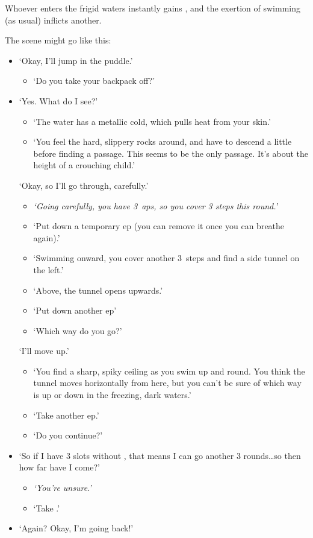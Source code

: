 \begin{multicols}{2}
Whoever enters the frigid waters instantly gains , and the exertion of swimming (as usual) inflicts another.

The scene might go like this:

\begin{itemize}
  \bf
  \item
  `Okay, I'll jump in the puddle.'
  \begin{itemize}
    \it
    \item
    `Do you take your backpack off?'
  \end{itemize}
  \item
  `Yes.
  What do I see?'
  \begin{itemize}
    \it
    \item
    `The water has a metallic cold, which pulls heat from your skin.'
    \item
    `You feel the hard, slippery rocks around, and have to descend a little before finding a passage.
    This seems to be the only passage.
    It's about the height of a crouching child.'
  \end{itemize}
  `Okay, so I'll go through, carefully.'
  \begin{itemize}
    \item
    \it
    `Going carefully, you have 3~\glspl{ap}, so you cover 3 steps this round.'
    \item
    `Put down a temporary \gls{ep} (you can remove it once you can breathe again).'
    \item
    `Swimming onward, you cover another 3~\glspl{step} and find a side tunnel on the left.'
    \item
    `Above, the tunnel opens upwards.'
    \item
    `Put down another \gls{ep}'
    \item
    `Which way do you go?'
  \end{itemize}
  `I'll move up.'
  \begin{itemize}
    \it
    \item
    `You find a sharp, spiky ceiling as you swim up and round.
    You think the tunnel moves horizontally from here, but you can't be sure of which way is up or down in the freezing, dark waters.'
    \item
    `Take another \gls{ep}.'
    \item
    `Do you continue?'
  \end{itemize}
  \item
  `So if I have 3 slots without , that means I can go another 3 rounds\ldots so then how far have I come?'
  \begin{itemize}
    \item
    \it
    `You're unsure.'
    \item
    `Take .'
  \end{itemize}
  \item
  `Again?
  Okay, I'm going back!'
\end{itemize}


\end{multicols}
